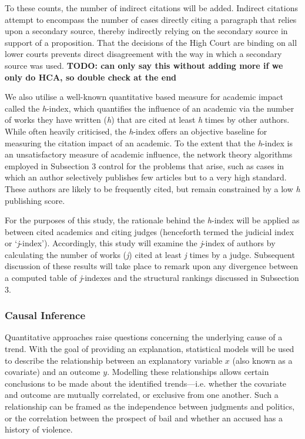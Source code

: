 To these counts, the number of indirect citations will be added. Indirect citations attempt to encompass the number of cases directly citing a paragraph that relies upon a secondary source, thereby indirectly relying on the secondary source in support of a proposition. That the decisions of the High Court are binding on all lower courts prevents direct disagreement with the way in which a secondary source was used.\xn{} \textbf{TODO: can only say this without adding more if we only do HCA, so double check at the end}

We also utilise a well-known quantitative based measure for academic impact called the \emph{h}-index, which quantifies the influence of an academic via the number of works they have written (\emph{h}) that are cited at least \emph{h} times by other authors. While often heavily criticised, the \emph{h}-index offers an objective baseline for measuring the citation impact of an academic. To the extent that the \emph{h}-index is an unsatisfactory measure of academic influence, the network theory algorithms employed in Subsection 3 control for the problems that arise, such as cases in which an author selectively publishes few articles but to a very high standard. These authors are likely to be frequently cited, but remain constrained by a low \textit{h} publishing score.\xn{}

For the purposes of this study, the rationale behind the \textit{h}-index will be applied as between cited academics and citing judges (henceforth termed the judicial index or `\textit{j}-index'). Accordingly, this study will examine the \emph{j}-index of authors by calculating the number of works (\textit{j}) cited at least \textit{j} times by a judge. Subsequent discussion of these results will take place to remark upon any divergence between a computed table of \emph{j}-indexes and the structural rankings discussed in Subsection 3.

\subsubsection{Causal Inference}
Quantitative approaches raise questions concerning the underlying cause of a trend. With the goal of providing an explanation, statistical models will be used to describe the relationship between an explanatory variable $x$ (also known as a covariate) and an outcome $y$. Modelling these relationships allows certain conclusions to be made about the identified trends---i.e. whether the covariate and outcome are mutually correlated, or exclusive from one another. Such a relationship can be framed as the independence between judgments and politics, or the correlation between the prospect of bail and whether an accused has a history of violence.

